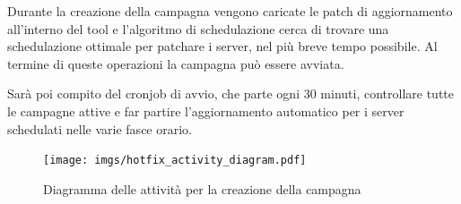 Durante la creazione della campagna vengono caricate le patch di aggiornamento 
all’interno del tool e l’algoritmo di schedulazione cerca di trovare una 
schedulazione ottimale per patchare i server, nel più breve tempo possibile. 
Al termine di queste operazioni la campagna può essere avviata.

Sarà poi compito del cronjob di avvio, che parte ogni 30 minuti, controllare 
tutte le campagne attive e far partire l'aggiornamento automatico per i server 
schedulati nelle varie fasce orario.

\begin{figure}[H]
  \begin{flushright}
    \centering
    \texttt{[image: imgs/hotfix\_activity\_diagram.pdf]}
    \caption{Diagramma delle attività per la creazione della campagna}
    \label{fig:Diagramma delle attività per la creazione della campagna}
  \end{flushright}
\end{figure}